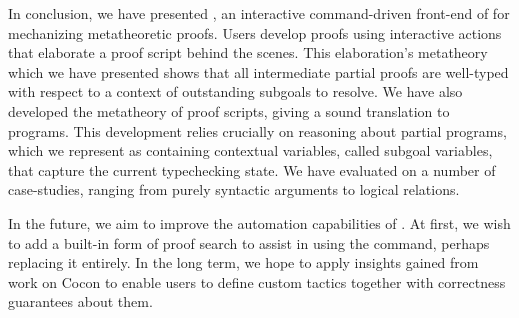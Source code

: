 In conclusion, we have presented \Harpoon, an interactive command-driven
front-end of \Beluga{} for mechanizing metatheoretic proofs.
Users develop proofs using interactive actions that elaborate a proof script
behind the scenes.
This elaboration's metatheory which we have presented shows that all
intermediate partial proofs are well-typed with respect to a context of
outstanding subgoals to resolve.
We have also developed the metatheory of proof scripts, giving a sound
translation to \Beluga{} programs.
This development relies crucially on reasoning about partial programs, which we
represent as containing contextual variables, called subgoal variables, that
capture the current typechecking state.
We have evaluated \Harpoon{} on a number of case-studies, ranging from purely
syntactic arguments to logical relations.

In the future, we aim to improve the automation capabilities of \Harpoon.
At first, we wish to add a built-in form of proof search to assist in using the
\ttsolves command, perhaps replacing it entirely. In the long term, we hope to
apply insights gained from work on Cocon \cite{cocon} to enable users to define
custom tactics together with correctness guarantees about them.

